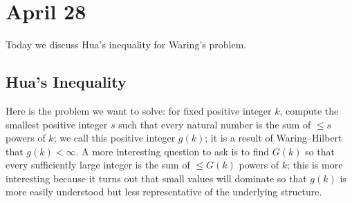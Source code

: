 \documentclass[../notes.tex]{subfiles}
\begin{document}
\section{April 28}

Today we discuss Hua's inequality for Waring's problem.

\subsection{Hua's Inequality}
Here is the problem we want to solve: for fixed positive integer $k$, compute the smallest positive integer $s$ such that every natural number is the sum of $\le s$ powers of $k$; we call this positive integer $g(k)$; it is a result of Waring--Hilbert that $g(k)<\infty$. A more interesting question to ask is to find $G(k)$ so that every sufficiently large integer is the sum of $\le G(k)$ powers of $k$; this is more interesting because it turns out that small values will dominate so that $g(k)$ is more easily understood but less representative of the underlying structure.
\end{document}
